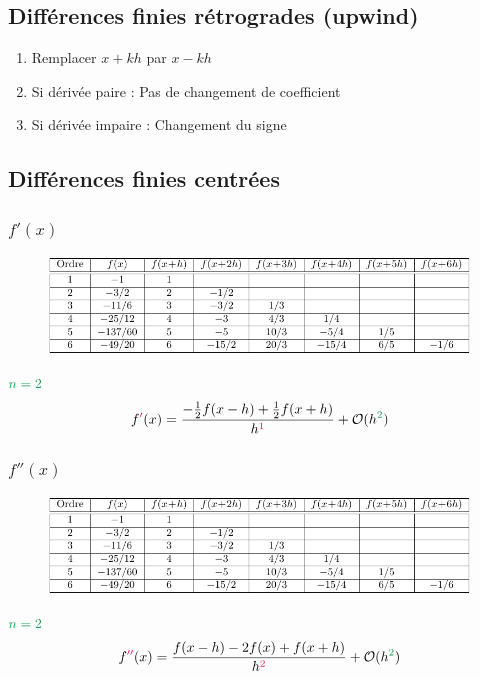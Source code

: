 \documentclass[resume]{subfiles}
\begin{document}
\subsection{Différences finies rétrogrades (upwind)}
\begin{enumerate}
\item Remplacer $x+kh$ par $x-kh$
\item Si dérivée paire : Pas de changement de coefficient
\item Si dérivée impaire : Changement du signe
\end{enumerate}
\subsection{Différences finies centrées}
\subsubsection{$f'(x)$}
\begin{figure}[H]
\centering
\includegraphics[width=\columnwidth,page=5]{diff_finies_tableaux.pdf}
\end{figure}
$\textcolor{ForestGreen}{n=2}$
$$f\textcolor{OrangeRed}{'}(x)=\frac{-\frac{1}{2}f(x-h)+\frac{1}{2}f(x+h)}{h^{\textcolor{OrangeRed}{1}}}+\mathcal{O}(h^{\textcolor{ForestGreen}{2}})$$
\subsubsection{$f''(x)$}
\begin{figure}[H]
\centering
\includegraphics[width=\columnwidth,page=6]{diff_finies_tableaux.pdf}
\end{figure}
$\textcolor{ForestGreen}{n=2}$
$$f\textcolor{OrangeRed}{''}(x)=\frac{f(x-h)-2f(x)+f(x+h)}{h^{\textcolor{OrangeRed}{2}}}+\mathcal{O}(h^{\textcolor{ForestGreen}{2}})$$
\end{document}
